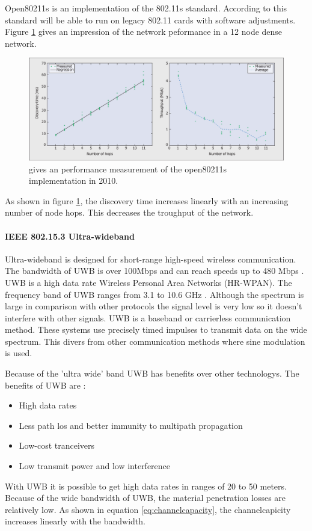 \documentclass[10pt,a4paper]{article}
\begin{document}
Open80211s is an implementation of the 802.11s standard. According to \cite{ieee80211sthewlanmeshstandard} this standard will be able to run on legacy 802.11 cards with software adjustments. Figure \ref{fig:open80211s} gives an impression of the network peformance in a 12 node dense network. 
\begin{figure}[H]
   \centering
   \includegraphics[width=1\textwidth]{open80211s}
   \caption{\cite{ieee80211sthewlanmeshstandard} gives an performance measurement of the open80211s implementation in 2010.}
   \label{fig:open80211s}
\end{figure}
As shown in figure \ref{fig:open80211s}, the discovery time increases linearly with an increasing number of node hops. This decreases the troughput of the network.

\paragraph{IEEE 802.15.3 Ultra-wideband}
Ultra-wideband is designed for short-range high-speed wireless communication. The bandwidth of UWB is over 100Mbps and can reach speeds up to 480 Mbps \cite{comparitivestudywirelessprotocols}. UWB is a high data rate Wireless Personal Area Networks (HR-WPAN). The frequency band of UWB ranges from 3.1 to 10.6 GHz \cite{ultrawidebandwirelesscommunications}. Although the spectrum is large in comparison with other protocols the signal level is very low so it doesn't interfere with other signals. UWB is a baseband or carrierless communication method. These systems use precisely timed impulses to transmit data on the wide spectrum. This divers from other communication methods where sine modulation is used. \cite{Bluetoothwifisurveyandcomparison}

Because of the 'ultra wide' band UWB has benefits over other technologys. The benefits of UWB are \cite{ultrawidebandwirelesscommunications}\cite{combook}: 
\begin{itemize}
\setlength\itemsep{0em}
    \item High data rates
    \item Less path los and better immunity to multipath propagation
    \item Low-cost tranceivers
    \item Low transmit power and low interference
\end{itemize}
 With UWB it is possible to get high data rates in ranges of 20 to 50 meters. Because of the wide bandwidth of UWB, the material penetration losses are relatively low. As shown in equation \ref{eq:channelcapacity}, the channelcapicity increases linearly with the bandwidth.
\end{document}
